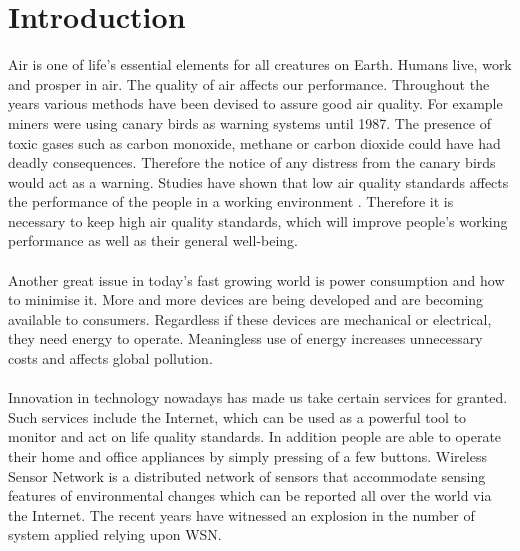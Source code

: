 \documentclass[12pt,a4paper]{report}
\begin{document}
\chapter{Introduction}
%
Air is one of life's essential elements for all creatures on Earth. Humans live, work and prosper in air. The quality of air affects our performance. Throughout the years various methods have been devised to assure good air quality. For example miners were using canary birds as warning systems until 1987. The presence of toxic gases such as carbon monoxide, methane or carbon dioxide could have had deadly consequences. Therefore the notice of any distress from the canary birds would act as a warning. Studies have shown that low air quality standards affects the performance of the people in a working environment \cite{airquality}. Therefore it is necessary to keep high air quality standards, which will improve people's working performance as well as their general well-being.\\
\ \\
Another great issue in today's fast growing world is power consumption and how to minimise it. More and more devices are being developed and are becoming available to consumers. Regardless if these devices are mechanical or electrical, they need energy to operate. Meaningless use of energy increases unnecessary costs and affects global pollution.\\
\ \\
Innovation in technology nowadays has made us take certain services for granted. Such services include the Internet, which can be used as a powerful tool to monitor and act on life quality standards. In addition people are able to operate their home and office appliances by simply pressing of a few buttons. Wireless Sensor Network is a distributed network of sensors that accommodate sensing features of environmental changes which can be reported all over the world via the Internet. The recent years have witnessed an explosion in the number of system applied relying upon WSN.\\
\ \\
\end{document}
